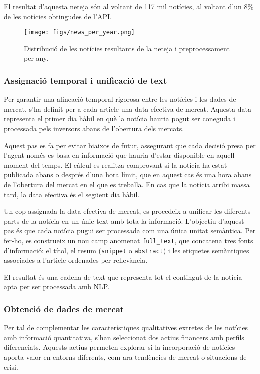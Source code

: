 \documentclass[12pt,a4paper,twoside]{book}
\begin{document}
El resultat d'aquesta neteja són al voltant de 117 mil notícies, al voltant d'un 8\% de les notícies obtingudes de l'API.
\begin{figure}[H]
	\centering
	\texttt{[image: figs/news\_per\_year.png]}
	\caption{Distribució de les notícies resultants de la neteja i preprocessament per any.}
	\label{fig:context-anoni1}
\end{figure}

\subsubsection*{Assignació temporal i unificació de text}

Per garantir una alineació temporal rigorosa entre les notícies i les dades de mercat, s'ha definit per a cada article una data efectiva de mercat. Aquesta data representa el primer dia hàbil en què la notícia hauria pogut ser coneguda i processada pels inversors abans de l'obertura dels mercats.

Aquest pas es fa per evitar biaixos de futur, assegurant que cada decisió presa per l'agent només es basa en informació que hauria d'estar disponible en aquell moment del temps. El càlcul es realitza comprovant si la notícia ha estat publicada abans o després d'una hora límit, que en aquest cas és una hora abans de l'obertura del mercat en el que es treballa. En cas que la notícia arribi massa tard, la data efectiva és el següent dia hàbil.

Un cop assignada la data efectiva de mercat, es procedeix a unificar les diferents parts de la notícia en un únic text amb tota la informació. L'objectiu d'aquest pas és que cada notícia pugui ser processada com una única unitat semàntica. Per fer-ho, es construeix un nou camp anomenat \texttt{full\_text}, que concatena tres fonts d'informació: el títol, el resum (\texttt{snippet} o \texttt{abstract}) i les etiquetes semàntiques associades a l'article ordenades per rellevància.

El resultat és una cadena de text que representa tot el contingut de la notícia apta per ser processada amb NLP.


\subsubsection{Obtenció de dades de mercat}

Per tal de complementar les característiques qualitatives extretes de les notícies amb informació quantitativa, s'han seleccionat dos actius financers amb perfils diferenciats. Aquests actius permeten explorar si la incorporació de notícies aporta valor en entorns diferents, com ara tendències de mercat o situacions de crisi.
\end{document}
